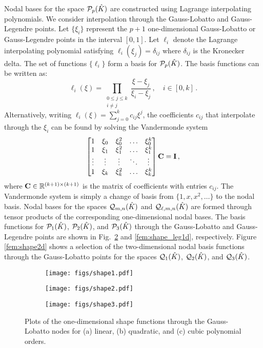 \documentclass[../doc.tex]{subfiles}
\begin{document}
Nodal bases for the space $\mathcal{P}_{p}(\hat{K})$ are constructed using Lagrange interpolating polynomials. We consider interpolation through the Gauss-Lobatto and Gauss-Legendre points. Let $\{\xi_i\}$ represent the $p+1$ one-dimensional Gauss-Lobatto or Gauss-Legendre points in the interval $[0,1]$. Let $\ell_i$ denote the Lagrange interpolating polynomial satisfying $\ell_i(\xi_j) = \delta_{ij}$ where $\delta_{ij}$ is the Kronecker delta. The set of functions $\{\ell_i\}$ form a basis for $\mathcal{P}_{p}(\hat{K})$. The basis functions can be written as:  
	\begin{equation}
		\ell_i(\xi) = \prod_{\substack{0\leq j \leq k\\i\neq j}} \frac{\xi - \xi_j}{\xi_i - \xi_j} \,, \quad i \in [0,k] \,. 
	\end{equation}
Alternatively, writing $\ell_i(\xi) = \sum_{j=0}^k c_{ij} \xi^j$, the coefficients $c_{ij}$ that interpolate through the $\xi_i$ can be found by solving the Vandermonde system 
	\begin{equation}
		\begin{bmatrix} 
			1 & \xi_0 & \xi_0^2 & \ldots & \xi_0^k \\
			1 & \xi_{1} & \xi_{1}^2 & \ldots & \xi_{1}^k \\
			\vdots & \vdots & \vdots & \ddots & \vdots \\
			1 & \xi_{k} & \xi_{k}^2 & \ldots & \xi_{k}^k 
		\end{bmatrix}
		\boldsymbol{\mathrm{C}} = \boldsymbol{\mathrm{I}} \,,
	\end{equation}
where $\boldsymbol{\mathrm{C}} \in \mathbb{R}^{(k+1)\times(k+1)}$ is the matrix of coefficients with entries $c_{ij}$. The Vandermonde system is simply a change of basis from $\{1,x,x^2,\ldots\}$ to the nodal basis. Nodal bases for the spaces $\mathcal{Q}_{m,n}(\hat{K})$ and $\mathcal{Q}_{\ell,m,n}(\hat{K})$ are formed through tensor products of the corresponding one-dimensional nodal bases.
The basis functions for $\mathcal{P}_{1}(\hat{K})$, $\mathcal{P}_{2}(\hat{K})$, and $\mathcal{P}_{3}(\hat{K})$ through the Gauss-Lobatto and Gauss-Legendre points are shown in Fig.~\ref{fem:shape1d} and \ref{fem:shape_leg1d}, respectively.  Figure \ref{fem:shape2d} shows a selection of the two-dimensional nodal basis functions through the Gauss-Lobatto points for the spaces $\mathcal{Q}_{1}(\hat{K})$, $\mathcal{Q}_{2}(\hat{K})$, and $\mathcal{Q}_{3}(\hat{K})$. 
\begin{figure}
\centering
\begin{subfigure}{.30\textwidth}
	\centering
	\texttt{[image: figs/shape1.pdf]}
	\caption{}
	\label{fem:shape1d_linear}
\end{subfigure}
\begin{subfigure}{.30\textwidth}
	\centering
	\texttt{[image: figs/shape2.pdf]}
	\caption{}
\end{subfigure}
\begin{subfigure}{.30\textwidth}
	\centering
	\texttt{[image: figs/shape3.pdf]}
	\caption{}
\end{subfigure}
\caption{Plots of the one-dimensional shape functions through the Gauss-Lobatto nodes for (a) linear, (b) quadratic, and (c) cubic polynomial orders.}
\label{fem:shape1d}
\end{figure}
\end{document}
